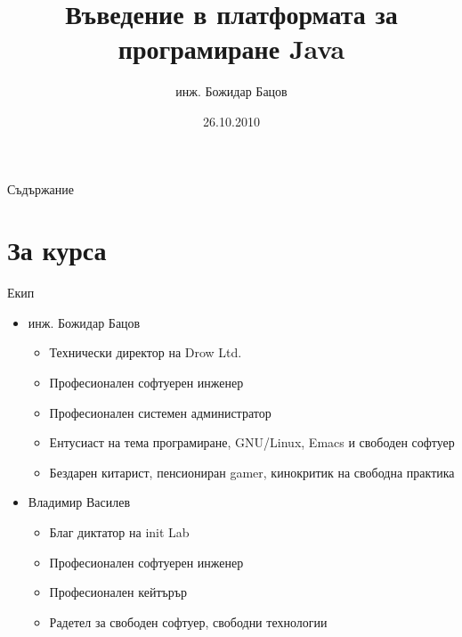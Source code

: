 \documentclass{beamer}
\title{Въведение в платформата за програмиране Java}
\author{инж. Божидар Бацов}
\institute{Drow Ltd.}
\date{26.10.2010}
\begin{document}
\begin{frame}
  \titlepage
\end{frame}

\begin{frame}{Съдържание}
  \transdissolve
  \tableofcontents[pausesections]
\end{frame}

\section{За курса}

\begin{frame}{Екип}
  \transdissolve
  \begin{itemize}
  \item инж. Божидар Бацов
    \begin{itemize}
    \item Технически директор на Drow Ltd.
    \item Професионален софтуерен инженер
    \item Професионален системен администратор
    \item Ентусиаст на тема програмиране, GNU/Linux, Emacs и свободен
      софтуер
    \item Бездарен китарист, пенсиониран gamer, кинокритик на свободна
      практика
    \end{itemize}
    \pause
  \item Владимир Василев
    \begin{itemize}
      \item Благ диктатор на init Lab
      \item Професионален софтуерен инженер
      \item Професионален кейтърър
      \item Радетел за свободен софтуер, свободни технологии
    \end{itemize}
  \end{itemize}
\end{frame}
\end{document}
